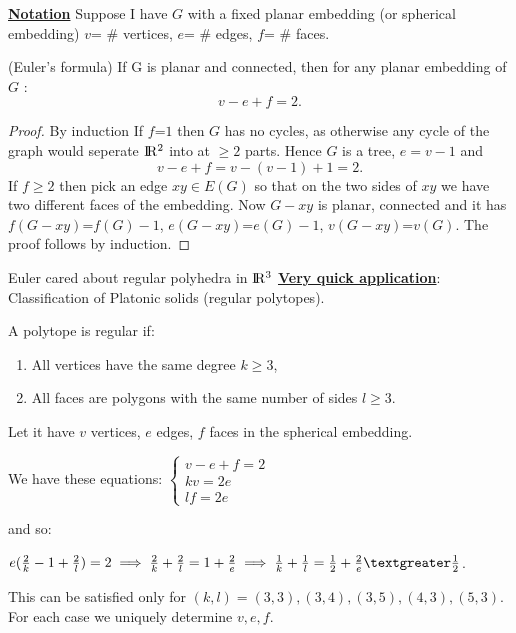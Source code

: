 \bigskip
\underline{\textbf{Notation}} Suppose I have {$G$} with a fixed planar embedding (or spherical embedding)
\newline
				     {$v$}= \# vertices, {$e$}= \# edges, {$f$}= \# faces.
\begin {theorem}
(Euler's formula) If G is planar and connected, then for any planar embedding of {$G$} :   
$$v-e+f=2.$$
\end {theorem}
\begin {proof}
By induction
\newline
If {$f$}={$1$} then {$G$} has no cycles, as otherwise any cycle of the graph would seperate ${\rm I\!R^2}$ into at $\geq 2$ parts. Hence {$G$} is a tree, $e=v-1$ and
$$v-e+f=v-(v-1)+1=2.$$
If $f\geqslant 2$ then pick an edge $xy\in E(G)$ so that on the two sides of {$xy$} we have two different faces of the embedding.
Now {$G-xy$} is planar, connected and it has 
{$f(G-xy)$}={$f(G)-1$},
{$e(G-xy)$}={$e(G)-1$},
{$v(G-xy)$}={$v(G)$}. 
The proof follows by induction.
\end {proof}
\bigskip
Euler cared about regular polyhedra in ${\rm I\!R^3}$
\newline
\underline{\textbf{Very quick application}}: Classification of Platonic solids (regular polytopes).
\begin {definition} A polytope is regular if:
\begin {enumerate}
\item All vertices have the same degree $k\geqslant3$,
\item All faces are polygons with the same number of sides $l\geqslant3$.
\end {enumerate}
\end {definition}
Let it have {$v$} vertices, {$e$} edges, {$f$} faces in the spherical embedding.

We have these equations:
$\begin{cases}
v-e+f=2\\
kv=2e \\
lf=2e 
\end {cases}$

and so:

$e(\frac{2}{k}-1+\frac{2}{l})=2 \implies \frac{2}{k}+\frac{2}{l}=1+\frac{2}{e}\implies \frac{1}{k}+\frac{1}{l}=\frac{1}{2}+\frac{2}{e}\textgreater \frac{1}{2}$. 

This can be satisfied only for $(k,l)=(3,3),(3,4),(3,5),(4,3),(5,3)$. For each case we uniquely determine $v,e,f$.

